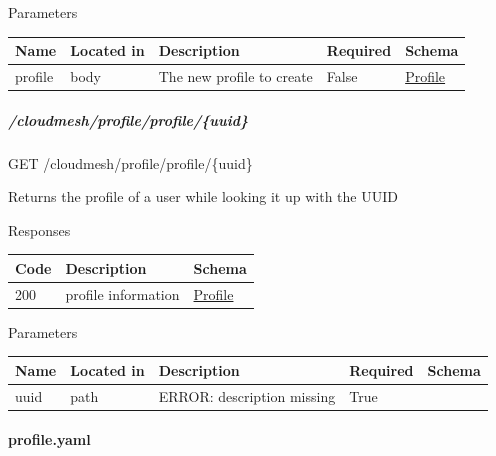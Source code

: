 \documentclass[9pt,]{article}
\let\oldparagraph\paragraph
\renewcommand{\paragraph}[1]{\oldparagraph{#1}\mbox{}}
\let\oldsubparagraph\subparagraph
\renewcommand{\subparagraph}[1]{\oldsubparagraph{#1}\mbox{}}
\begin{document}
Parameters

\begin{longtable}[]{@{}lllll@{}}
\toprule
Name & Located in & Description & Required & Schema\tabularnewline
\midrule
\endhead
profile & body & The new profile to create & False &
\protect\hyperlink{profile}{Profile}\tabularnewline
\bottomrule
\end{longtable}

\hypertarget{cloudmeshprofileprofileuuid}{%
\subparagraph{/cloudmesh/profile/profile/\{uuid\}}\label{cloudmeshprofileprofileuuid}}

GET /cloudmesh/profile/profile/\{uuid\}

Returns the profile of a user while looking it up with the UUID

Responses

\begin{longtable}[]{@{}lll@{}}
\toprule
Code & Description & Schema\tabularnewline
\midrule
\endhead
200 & profile information &
\protect\hyperlink{profile}{Profile}\tabularnewline
\bottomrule
\end{longtable}

Parameters

\begin{longtable}[]{@{}lllll@{}}
\toprule
Name & Located in & Description & Required & Schema\tabularnewline
\midrule
\endhead
uuid & path & ERROR: description missing & True &\tabularnewline
\bottomrule
\end{longtable}

\hypertarget{profile.yaml}{%
\paragraph{profile.yaml}\label{profile.yaml}}
\end{document}
